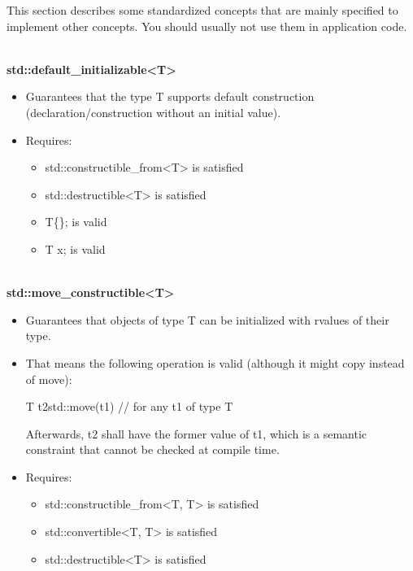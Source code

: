 

This section describes some standardized concepts that are mainly specified to implement other concepts. You should usually not use them in application code.


\noindent
\hspace*{\fill} \\ %
\textbf{std::default\_initializable<T>}

\begin{itemize}
\item
Guarantees that the type T supports default construction (declaration/construction without an initial value).

\item
Requires:
\begin{itemize}
\item
std::constructible\_from<T> is satisfied

\item
std::destructible<T> is satisfied

\item
T\{\}; is valid

\item
T x; is valid
\end{itemize}
\end{itemize}

\noindent
\hspace*{\fill} \\ %
\textbf{std::move\_constructible<T>}

\begin{itemize}
\item
Guarantees that objects of type T can be initialized with rvalues of their type.

\item
That means the following operation is valid (although it might copy instead of move):

\begin{cpp}
T t2{std::move(t1)} // for any t1 of type T
\end{cpp}

Afterwards, t2 shall have the former value of t1, which is a semantic constraint that cannot be checked at compile time.

\item
Requires:
\begin{itemize}
\item
std::constructible\_from<T, T> is satisfied

\item
std::convertible<T, T> is satisfied

\item
std::destructible<T> is satisfied
\end{itemize}
\end{itemize}



